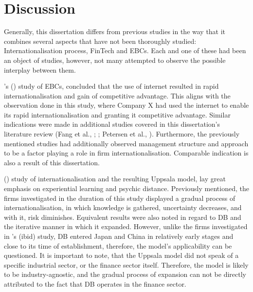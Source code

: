 \documentclass[11pt,a4paper]{article}
\begin{document}
{{{	
\newpage

\section{Discussion}
\vspace{-2mm}
\label{discussion}
\frenchspacing
{} \par %
Generally, this dissertation differs from previous studies in the way that it combines several aspects that have not been thoroughly studied: Internationalisation process, FinTech and EBCs. Each and one of these had been an object of studies, however, not many attempted to observe the possible interplay between them. \par
\citeauthor{loaneCrossnationalComparisonInternationalisation2002}'s (\citeyear{loaneCrossnationalComparisonInternationalisation2002}) study of EBCs, concluded that the use of internet resulted in rapid internationalisation and gain of competitive advantage. This aligns with the observation done in this study, where Company X had used the internet to enable its rapid internationalisation and granting it competitive advantage. Similar indications were made in additional studies covered in this dissertation's literature review (Fang et al., \citeyear{fangParachutingInternationalizationStudy2017}; \cite{terziImpactEcommerceInternational2011}; Petersen et al., \citeyear{petersenInternetForeignMarket2002}). Furthermore, the previously mentioned studies had additionally observed management structure and approach to be a factor playing a role in firm internationalisation. Comparable indication is also a result of this dissertation.  \par
\citeauthor{johansonInternationalizationProcessFirm1977} (\citeyear{johansonInternationalizationProcessFirm1977}) study of internationalisation and the resulting Uppsala model, lay great emphasis on experiential learning and psychic distance. Previously mentioned, the firms investigated in the duration of this study displayed a gradual process of internationalisation, in which knowledge is gathered, uncertainty decreases, and with it, risk diminishes. Equivalent results were also noted in regard to DB and the iterative manner in which it expanded. However, unlike the firms investigated in \citeauthor{johansonInternationalizationProcessFirm1977}'s (ibid) study, DB entered Japan and China in relatively early stages and close to its time of establishment, therefore, the model's applicability can be questioned. It is important to note, that the Uppsala model did not speak of a specific industrial sector, or the finance sector itself. Therefore, the model is likely to be industry-agnostic, and the gradual process of expansion can not be directly attributed to the fact that DB operates in the finance sector. \par
}}}
\end{document}
